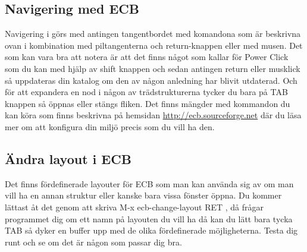 \documentclass[12pt]{article} %
\begin{document}
\subsection{Navigering med ECB}
Navigering i görs med antingen tangentbordet med komandona som är beskrivna ovan i kombination med piltangenterna och return-knappen eller med musen. Det som kan vara bra att notera är att det finns något som kallar för Power Click som du kan med hjälp av shift knappen och sedan antingen return eller musklick så uppdateras din katalog om den av någon anledning har blivit utdaterad. Och för att expandera en nod i någon av trädstrukturerna tycker du bara på TAB knappen så öppnas eller stängs fliken. Det finns mängder med kommandon du kan köra som finns beskrivna på hemsidan \url{http://ecb.sourceforge.net} där du läsa mer om att konfigura din miljö precis som du vill ha den.
\subsection{Ändra layout i ECB}
Det finns fördefinerade layouter för ECB som man kan använda sig av om man vill ha en annan struktur eller kanske bara vissa fönster öppna. Du kommer lättast åt det genom att skriva M-x ecb-change-layout RET , då frågar programmet dig om ett namn på layouten du vill ha då kan du lätt bara tycka TAB så dyker en buffer upp med de olika fördefinerade möjligheterna. Testa dig runt och se om det är någon som passar dig bra.






\end{document}
